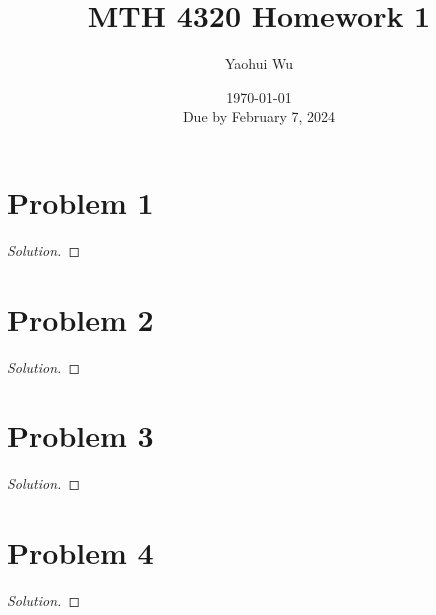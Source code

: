 \documentclass[12pt, letterpaper]{article}
\title{MTH 4320 Homework 1}
\author{Yaohui Wu}
\date{\today \\ Due by February 7, 2024}
\newenvironment{solution}{\begin{proof}[Solution]}{\end{proof}}
\begin{document}
\maketitle
\tableofcontents
\section{Problem 1}
\begin{solution}
    
\end{solution}

\section{Problem 2}
\begin{solution}
    
\end{solution}

\section{Problem 3}
\begin{solution}
    
\end{solution}

\section{Problem 4}
\begin{solution}
    
\end{solution}
\end{document}
